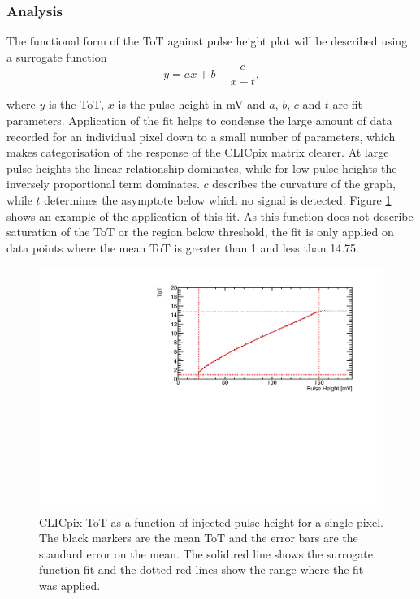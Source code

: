 
\subsubsection{Analysis}
The functional form of the ToT against pulse height plot will be described using a surrogate function \cite{AlipourTehrani:2054922}
\begin{equation}
y  = ax + b  - \frac{c}{x-t} \text{,}
\end{equation}

\noindent where $y$ is the ToT, $x$ is the pulse height in mV and $a$, $b$, $c$ and $t$ are fit parameters.  Application of the fit helps to condense the large amount of data recorded for an individual pixel down to a small number of parameters, which makes categorisation of the response of the CLICpix matrix clearer.  At large pulse heights the linear relationship dominates, while for low pulse heights the inversely proportional term dominates.  $c$ describes the curvature of the graph, while $t$ determines the asymptote below which no signal is detected.  Figure \ref{fig:testpulseexamplefit} shows an example of the application of this fit.  As this function does not describe saturation of the ToT or the region below threshold, the fit is only applied on data points where the mean ToT is greater than 1 and less than 14.75.  

\begin{figure}
\centering
\includegraphics[width=1.0\textwidth]{CLICdpVertex/Plots/TestPulseCalibration/Fits/Set9/ToT_PulseHeight_Set_9_ChipID_001ec0db94b1_Pixel_x0_y0_Fit.pdf}
\caption[CLICpix ToT as a function of injected pulse height.]{CLICpix ToT as a function of injected pulse height for a single pixel.  The black markers are the mean ToT and the error bars are the standard error on the mean.  The solid red line shows the surrogate function fit and the dotted red lines show the range where the fit was applied.}
\label{fig:testpulseexamplefit}
\end{figure}

